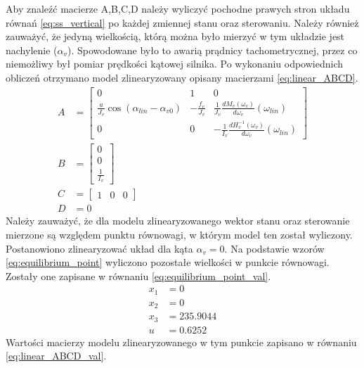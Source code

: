 \documentclass[11pt,a4paper]{article}
\begin{document}
Aby znaleźć macierze A,B,C,D należy wyliczyć pochodne prawych stron układu równań \eqref{eq:ss_vertical} po każdej zmiennej stanu oraz sterowaniu. Należy również zauważyć, że jedyną wielkością, którą można było mierzyć w tym układzie jest nachylenie (\(\alpha_v\)). Spowodowane było to awarią prądnicy tachometrycznej, przez co niemożliwy był pomiar prędkości kątowej silnika. Po wykonaniu odpowiednich obliczeń otrzymano model zlinearyzowany opisany macierzami \eqref{eq:linear_ABCD}.
\begin{equation}
\begin{aligned}
A &=
	\begin{bmatrix}
	0 & 1 & 0\\
	\frac{a}{J_v}\cos(\alpha_{lin}-\alpha_{v0}) & -\frac{f_v}{J_v} & \frac{1}{J_v}\frac{dM_v(\omega_v)}{d\omega_v}(\omega_{lin})\\
	0 & 0 & -\frac{1}{I_v}\frac{dH_v^{-1}(\omega_v)}{d\omega_v}(\omega_{lin})
	\end{bmatrix}\\
B &=
	\begin{bmatrix}
	0\\
	0\\
	\frac{1}{I_v}
	\end{bmatrix}\\
C &=
	\begin{bmatrix}
	1 & 0 & 0
	\end{bmatrix}\\
D &= 0
\end{aligned}
\label{eq:linear_ABCD}
\end{equation}
Należy zauważyć, że dla modelu zlinearyzowanego wektor stanu oraz sterowanie mierzone są względem punktu równowagi, w którym model ten został wyliczony. Postanowiono zlinearyzować układ dla kąta \(\alpha_v=0\). Na podstawie wzorów \eqref{eq:equilibrium_point} wyliczono pozostałe wielkości w punkcie równowagi. Zostały one zapisane w równaniu \eqref{eq:equilibrium_point_val}.
\begin{equation}
\begin{aligned}
x_1 &= 0\\
x_2 &= 0\\
x_3 &= 235.9044\\
u &= 0.6252
\end{aligned}
\label{eq:equilibrium_point_val}
\end{equation}
Wartości macierzy modelu zlinearyzowanego w tym punkcie zapisano w równaniu \eqref{eq:linear_ABCD_val}.
\end{document}
